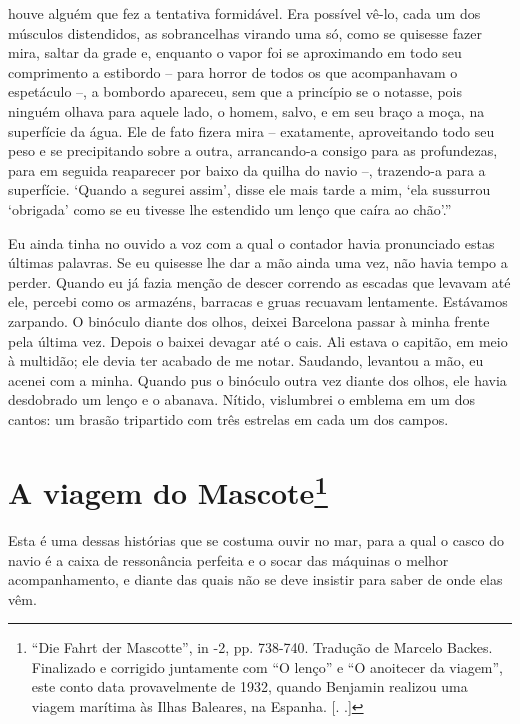houve alguém que fez a tentativa formidável. Era possível vê-lo, cada um
dos músculos distendidos, as sobrancelhas virando uma só, como se
quisesse fazer mira, saltar da grade e, enquanto o vapor foi se
aproximando em todo seu comprimento a estibordo -- para horror de todos
os que acompanhavam o espetáculo --, a bombordo apareceu, sem que a
princípio se o notasse, pois ninguém olhava para aquele lado, o homem,
salvo, e em seu braço a moça, na superfície da água. Ele de fato fizera
mira -- exatamente, aproveitando todo seu peso e se precipitando sobre a
outra, arrancando-a consigo para as profundezas, para em seguida
reaparecer por baixo da quilha do navio --, trazendo-a para a
superfície. `Quando a segurei assim', disse ele mais tarde a mim, `ela
sussurrou `obrigada' como se eu tivesse lhe estendido um lenço que caíra
ao chão'.''\label{supra9}

Eu ainda tinha no ouvido a voz com a qual o contador havia pronunciado
estas últimas palavras. Se eu quisesse lhe dar a mão ainda uma vez, não
havia tempo a perder. Quando eu já fazia menção de descer correndo as
escadas que levavam até ele, percebi como os armazéns, barracas e gruas
recuavam lentamente. Estávamos zarpando. O binóculo diante dos olhos,
deixei Barcelona passar à minha frente pela última vez. Depois o baixei
devagar até o cais. Ali estava o capitão, em meio à multidão; ele devia
ter acabado de me notar. Saudando, levantou a mão, eu acenei com a
minha. Quando pus o binóculo outra vez diante dos olhos, ele havia
desdobrado um lenço e o abanava. Nítido, vislumbrei o emblema em um dos
cantos: um brasão tripartido com três estrelas em cada um dos campos.

\chapter{A viagem do Mascote\footnote[*]{``Die Fahrt der Mascotte'', in  -2, pp.
  738-740. Tradução de Marcelo Backes. Finalizado e corrigido juntamente
  com ``O lenço'' e ``O anoitecer da viagem'', este conto data
  provavelmente de 1932, quando Benjamin realizou uma viagem marítima às
  Ilhas Baleares, na Espanha. [. .]} }

Esta é uma dessas histórias que se costuma ouvir no mar, para a qual o
casco do navio é a caixa de ressonância perfeita e o socar das máquinas
o melhor acompanhamento, e diante das quais não se deve insistir para
saber de onde elas vêm.

